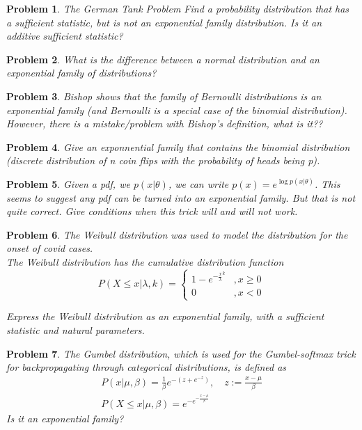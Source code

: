 \documentclass[a4paper]{article}
\newtheorem{problem}{Problem}[section]
\begin{document}
\begin{problem} The German Tank Problem
Find a probability distribution that has a sufficient statistic, but is not an exponential family distribution.  Is it an additive sufficient statistic?
\end{problem}

\begin{problem}
  What is the difference between a normal distribution and an exponential family of distributions?
\end{problem}

\begin{problem}
  Bishop shows that the family of Bernoulli distributions is an exponential family (and Bernoulli is a special case of the binomial distribution).  However, there is a mistake/problem with Bishop's definition, what is it??
\end{problem}

\begin{problem}
  Give an exponnential family that contains the binomial distribution (discrete distribution of n coin flips with the probability of heads being p).
\end{problem}

\begin{problem}
  Given a pdf, we $p(x \vert \theta)$, we can write $p(x) = e^{\log p( x \vert \theta)}$.  This seems to suggest any pdf can be turned into an exponential family.  But that is not quite correct.  Give conditions when this trick will and will not work.
\end{problem}

\begin{problem}
  The Weibull distribution was used to model the distribution for the onset of covid cases.  \\
  The Weibull distribution has the cumulative distribution function
  \begin{equation}
    P( X \leq x \vert \lambda, k ) = \begin{cases}
      1-e^{-\frac{x}{\lambda}^k} &, x \geq 0 \\
      0 &, x <0
    \end{cases}
    \label{}
  \end{equation}

Express the Weibull distribution as an exponential family, with a sufficient statistic and natural parameters.
\end{problem}

\begin{problem}
  The Gumbel distribution, which is used for the Gumbel-softmax trick for backpropagating through categorical distributions, is defined as
  \begin{equation}
    \begin{split}
      P( x \vert \mu, \beta ) = \frac{1}{\beta} e^{-(z+e^{-z})}, \quad z:= \frac{x-\mu}{\beta} \\
      P( X \leq x \vert \mu, \beta ) = e^{-e^{-\frac{x-\mu}{\beta}} }
    \end{split}
    \label{Gumbel}
  \end{equation}
Is it an exponential family?
\end{problem}
\end{document}
